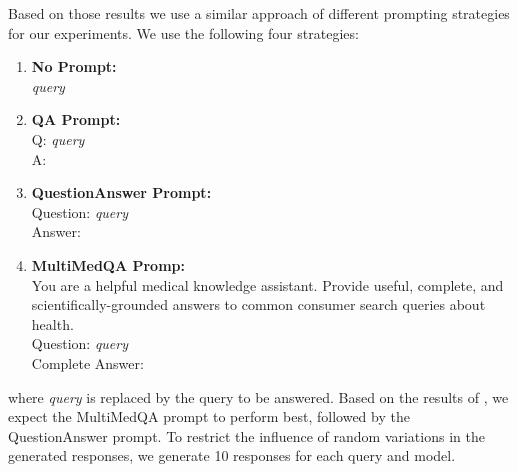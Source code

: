 Based on those results we use a similar approach of different prompting strategies for our experiments.
We use the following four strategies:
\begin{enumerate}
    \item \textbf{No Prompt:}\\ \textit{query}
    \item \textbf{QA Prompt:}\\ Q: \textit{query}\\A:
    \item \textbf{QuestionAnswer Prompt:}\\ Question: \textit{query}\\Answer:
    \item \textbf{MultiMedQA Promp:}\\ You are a helpful medical knowledge assistant. Provide useful, complete, and scientifically-grounded answers to common consumer search queries about health.\\Question: \textit{query}\\Complete Answer:
\end{enumerate}
where \textit{query} is replaced by the query to be answered.
Based on the results of \cite{reynolds:2021}, we expect the MultiMedQA prompt to perform best, followed by the QuestionAnswer prompt.
To restrict the influence of random variations in the generated responses, we generate 10 responses for each query and model.
\\
